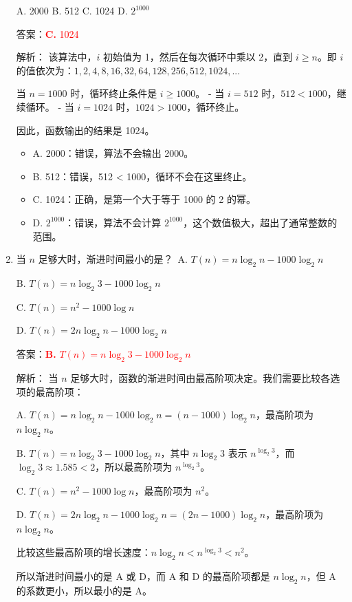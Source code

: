 \documentclass[lang=cn,newtx,10pt,scheme=chinese]{../../../elegantbook}
\begin{document}
\begin{enumerate}
    A. 2000 \quad B. 512 \quad C. 1024 \quad D. $2^{1000}$

    答案：\textcolor{red}{\textbf{C.} 1024}

    解析：
    该算法中，$i$ 初始值为 1，然后在每次循环中乘以 2，直到 $i \geq n$。即 $i$ 的值依次为：$1, 2, 4, 8, 16, 32, 64, 128, 256, 512, 1024, ...$
    
    当 $n = 1000$ 时，循环终止条件是 $i \geq 1000$。
    - 当 $i = 512$ 时，$512 < 1000$，继续循环。
    - 当 $i = 1024$ 时，$1024 > 1000$，循环终止。
    
    因此，函数输出的结果是 1024。

    \begin{itemize}
        \item A. 2000：错误，算法不会输出 2000。
        \item B. 512：错误，512 < 1000，循环不会在这里终止。
        \item C. 1024：正确，是第一个大于等于 1000 的 2 的幂。
        \item D. $2^{1000}$：错误，算法不会计算 $2^{1000}$，这个数值极大，超出了通常整数的范围。
    \end{itemize}

    \item 当 $n$ 足够大时，渐进时间最小的是？\
    A. $T(n)=n\log_2 n -1000\log_2 n$ \quad 
    
    B. $T(n)=n\log_2 3 -1000\log_2 n$ \

    C. $T(n)=n^2 -1000\log n$ \quad
    
    D. $T(n)=2n\log_2 n -1000\log_2 n$

    答案：\textcolor{red}{\textbf{B.} $T(n)=n\log_2 3 -1000\log_2 n$}

    解析：
    当 $n$ 足够大时，函数的渐进时间由最高阶项决定。我们需要比较各选项的最高阶项：
    
    A. $T(n)=n\log_2 n -1000\log_2 n = (n-1000)\log_2 n$，最高阶项为 $n\log_2 n$。
    
    B. $T(n)=n\log_2 3 -1000\log_2 n$，其中 $n\log_2 3$ 表示 $n^{\log_2 3}$，而 $\log_2 3 \approx 1.585 < 2$，所以最高阶项为 $n^{\log_2 3}$。
    
    C. $T(n)=n^2 -1000\log n$，最高阶项为 $n^2$。
    
    D. $T(n)=2n\log_2 n -1000\log_2 n = (2n-1000)\log_2 n$，最高阶项为 $n\log_2 n$。
    
    比较这些最高阶项的增长速度：$n\log_2 n < n^{\log_2 3} < n^2$。
    
    所以渐进时间最小的是 A 或 D，而 A 和 D 的最高阶项都是 $n\log_2 n$，但 A 的系数更小，所以最小的是 A。
    

\end{enumerate}
\end{document}

